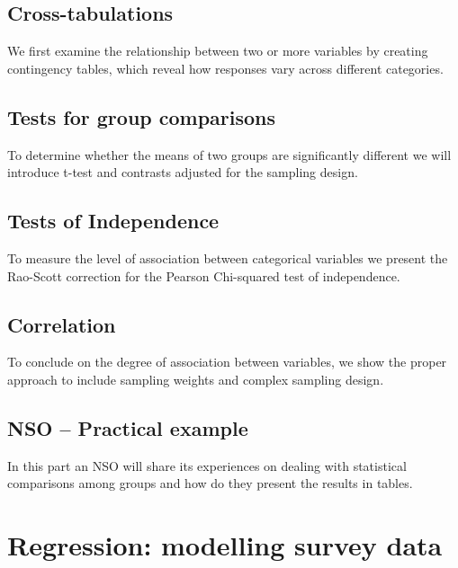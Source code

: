 \documentclass[
  12pt,
]{book}
\begin{document}
\hypertarget{cross-tabulations}{%
\section{Cross-tabulations}\label{cross-tabulations}}

We first examine the relationship between two or more variables by creating contingency tables, which reveal how responses vary across different categories.

\hypertarget{tests-for-group-comparisons}{%
\section{Tests for group comparisons}\label{tests-for-group-comparisons}}

To determine whether the means of two groups are significantly different we will introduce t-test and contrasts adjusted for the sampling design.

\hypertarget{tests-of-independence}{%
\section{Tests of Independence}\label{tests-of-independence}}

To measure the level of association between categorical variables we present the Rao-Scott correction for the Pearson Chi-squared test of independence.

\hypertarget{correlation}{%
\section{Correlation}\label{correlation}}

To conclude on the degree of association between variables, we show the proper approach to include sampling weights and complex sampling design.

\hypertarget{nso-practical-example-1}{%
\section{NSO -- Practical example}\label{nso-practical-example-1}}

In this part an NSO will share its experiences on dealing with statistical comparisons among groups and how do they present the results in tables.

\hypertarget{regression-modelling-survey-data}{%
\chapter{Regression: modelling survey data}\label{regression-modelling-survey-data}}
\end{document}
